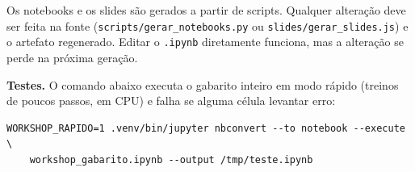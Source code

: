 \documentclass[
  11pt,
]{article}
\begin{document}
Os notebooks e os slides são gerados a partir de scripts. Qualquer
alteração deve ser feita na fonte (\texttt{scripts/gerar\_notebooks.py}
ou \texttt{slides/gerar\_slides.js}) e o artefato regenerado. Editar o
\texttt{.ipynb} diretamente funciona, mas a alteração se perde na
próxima geração.

\textbf{Testes.} O comando abaixo executa o gabarito inteiro em modo
rápido (treinos de poucos passos, em CPU) e falha se alguma célula
levantar erro:

\begin{verbatim}
WORKSHOP_RAPIDO=1 .venv/bin/jupyter nbconvert --to notebook --execute \
    workshop_gabarito.ipynb --output /tmp/teste.ipynb
\end{verbatim}
\end{document}
